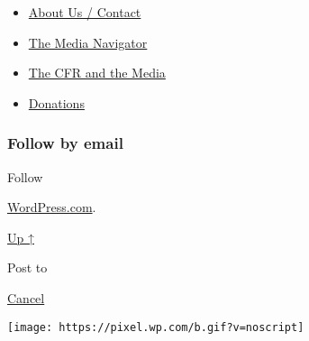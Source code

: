 \begin{itemize}
\tightlist
\item
  \href{https://swprs.org/contact/}{About Us / Contact}
\item
  \href{https://swprs.org/media-navigator/}{The Media Navigator}
\item
  \href{https://swprs.org/the-american-empire-and-its-media/}{The CFR
  and the Media}
\item
  \href{https://swprs.org/donations/}{Donations}
\end{itemize}

\hypertarget{follow-by-email}{%
\subsubsection{Follow by email}\label{follow-by-email}}

Follow

\href{https://wordpress.com/?ref=footer_custom_com}{WordPress.com}.

\protect\hyperlink{}{Up ↑}

Post to

\protect\hyperlink{}{Cancel}

\texttt{[image: https://pixel.wp.com/b.gif?v=noscript]}
